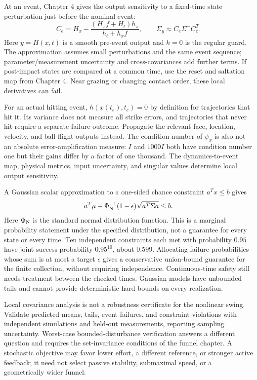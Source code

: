 At an event, Chapter 4 gives the output sensitivity to a fixed-time state
perturbation just before the nominal event:
\begin{equation}\label{eq:ocp_event_output}
 C_e=H_x-\frac{(H_xf+H_t)h_x}{h_t+h_xf},\qquad
 \Sigma_y\approx C_e\Sigma^-C_e^T.
\end{equation}
Here $y=H(x,t)$ is a smooth pre-event output and $h=0$ is the regular guard.
The approximation assumes small perturbations and the same event sequence;
parameter/measurement uncertainty and cross-covariances add further terms.
If post-impact states are compared at a common time, use the reset and
saltation map from Chapter 4. Near grazing or changing contact order, these
local derivatives can fail.

For an actual hitting event, $h(x(t_e),t_e)=0$ by definition for trajectories
that hit it. Its variance does not measure all strike errors, and trajectories
that never hit require a separate failure outcome. Propagate the relevant
face, location, velocity, and ball-flight outputs instead. The condition
number of $\psi_x$ is also not an absolute error-amplification measure:
$I$ and $1000I$ both have condition number one but their gains differ by
a factor of one thousand. The dynamics-to-event map, physical metrics,
input uncertainty, and singular values determine local output sensitivity.

A Gaussian scalar approximation to a one-sided chance constraint
$a^Tx\leq b$ gives
\begin{equation}\label{eq:ocp_chance_constraint}
 a^T\mu+\Phi_{\rm N}^{-1}(1-\epsilon)
 \sqrt{a^T\Sigma a}\leq b.
\end{equation}
Here $\Phi_{\rm N}$ is the standard normal distribution function. This is a
marginal probability statement under the specified distribution, not a
guarantee for every state or every time. Ten independent constraints each
met with probability $0.95$ have joint success probability $0.95^{10}$,
about $0.599$. Allocating failure probabilities whose sum is at most a
target $\epsilon$ gives a conservative union-bound guarantee for the finite
collection, without requiring independence. Continuous-time safety still
needs treatment between the checked times. Gaussian models have unbounded
tails and cannot provide deterministic hard bounds on every realization.

Local covariance analysis is not a robustness certificate for the nonlinear
swing. Validate predicted means, tails, event failures, and constraint
violations with independent simulations and held-out measurements, reporting
sampling uncertainty. Worst-case bounded-disturbance verification answers
a different question and requires the set-invariance conditions of the
funnel chapter. A stochastic objective may favor lower effort, a different
reference, or stronger active feedback; it need not select passive stability,
submaximal speed, or a geometrically wider funnel.

